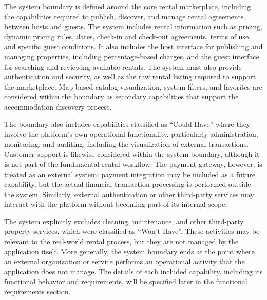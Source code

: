 The system boundary is defined around the core rental marketplace, including the capabilities required to 
publish, discover, and manage rental agreements between hosts and guests. The system includes rental information such 
as pricing, dynamic pricing rules, dates, check-in and check-out agreements, terms of use, and specific guest conditions. 
It also includes the host interface for publishing and managing properties, including percentage-based charges, and 
the guest interface for searching and reviewing available rentals. The system must also provide authentication and 
security, as well as the raw rental listing required to support the marketplace. Map-based catalog visualization, 
system filters, and favorites are considered within the boundary as secondary capabilities that support the accommodation 
discovery process.

The boundary also includes capabilities classified as ``Could Have'' where they involve the platform's own 
operational functionality, particularly administration, monitoring, and auditing, including the visualization of 
external transactions. Customer support is likewise considered within the system boundary, although it is not part of 
the fundamental rental workflow. The payment gateway, however, is treated as an external system: payment integration 
may be included as a future capability, but the actual financial transaction processing is performed outside the system. 
Similarly, external authentication or other third-party services may interact with the platform without becoming part 
of its internal scope.

The system explicitly excludes cleaning, maintenance, and other third-party property services, which were classified 
as ``Won't Have''. These activities may be relevant to the real-world rental process, but they are not managed by the 
application itself. More generally, the system boundary ends at the point where an external organization or service 
performs an operational activity that the application does not manage. The details of each included capability, including 
its functional behavior and requirements, will be specified later in the functional requirements section.